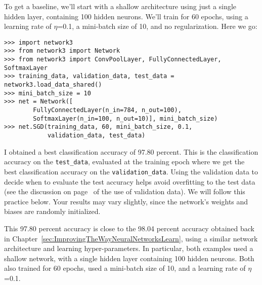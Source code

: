 To get a baseline, we'll start with a shallow architecture using just a single hidden layer, containing 100 hidden neurons. We'll train for 60 epochs, using a learning rate of $\eta$=0.1, a mini-batch size of 10, and no regularization. Here we go:

\begin{lstlisting}
>>> import network3
>>> from network3 import Network
>>> from network3 import ConvPoolLayer, FullyConnectedLayer, SoftmaxLayer
>>> training_data, validation_data, test_data = network3.load_data_shared()
>>> mini_batch_size = 10
>>> net = Network([
        FullyConnectedLayer(n_in=784, n_out=100),
        SoftmaxLayer(n_in=100, n_out=10)], mini_batch_size)
>>> net.SGD(training_data, 60, mini_batch_size, 0.1, 
            validation_data, test_data)
\end{lstlisting}

I obtained a best classification accuracy of 97.80 percent. This is the classification accuracy on the \lstinline{test_data}, evaluated at the training epoch where we get the best classification accuracy on the \lstinline{validation_data}. Using the validation data to decide when to evaluate the test accuracy helps avoid overfitting to the test data (see the discussion on page~\pageref{page:overfittingvalidationdata} of the use of validation data). We will follow this practice below. Your results may vary slightly, since the network's weights and biases are randomly initialized.

This 97.80 percent accuracy is close to the 98.04 percent accuracy obtained back in Chapter~\ref{sec:ImprovingTheWayNeuralNetworksLearn}, using a similar network architecture and learning hyper-parameters. In particular, both examples used a shallow network, with a single hidden layer containing 100 hidden neurons. Both also trained for 60 epochs, used a mini-batch size of 10, and a learning rate of $\eta$=0.1.

